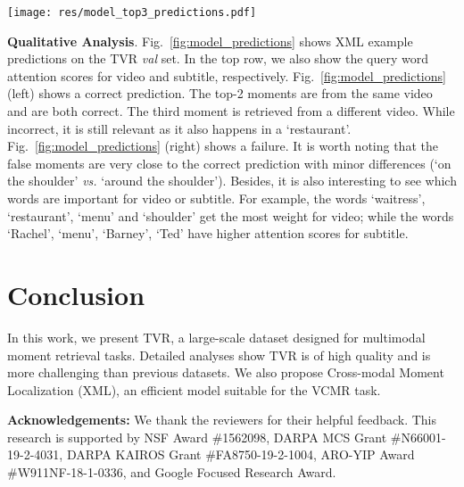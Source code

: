 \documentclass[runningheads]{llncs}
\begin{document}
\begin{figure*}[!t]
  \centering
  \texttt{[image: res/model\_top3\_predictions.pdf]}
  \caption{XML prediction examples for VCMR, on TVR \textit{val} set. We show top-3 retrieved moments for each query. \textit{Top row} shows modular attention scores for query words. \textit{Left column} shows a correct prediction, \textit{right column} shows a failure. Text inside \textit{dashed boxes} is the subtitles associated with the predicted moments. \textit{Orange box} shows the predictions, \textit{green bar} shows the ground truth}
  \label{fig:model_predictions}
\end{figure*}



\kern1mm
\noindent\textbf{Qualitative Analysis}.
Fig.~\ref{fig:model_predictions} shows XML example predictions on the TVR \textit{val} set. 
In the top row, we also show the query word attention scores for video and subtitle, respectively. Fig.~\ref{fig:model_predictions} (left) shows a correct prediction. The top-2 moments are from the same video and are both correct. The third moment is retrieved from a different video. While incorrect, it is still relevant as it also happens in a `restaurant'. Fig.~\ref{fig:model_predictions} (right) shows a failure. It is worth noting that the false moments are very close to the correct prediction with minor differences (`on the shoulder' \textit{vs.} `around the shoulder'). Besides, it is also interesting to see which words are important for video or subtitle. For example, the words `waitress', `restaurant', `menu' and `shoulder' get the most weight for video; while the words `Rachel', `menu', `Barney', `Ted' have higher attention scores for subtitle.


 \section{Conclusion}\label{conclusion}
In this work, we present TVR, a large-scale dataset designed for multimodal moment retrieval tasks. Detailed analyses show TVR is of high quality and is more challenging than previous datasets. We also propose Cross-modal Moment Localization (XML), an efficient model suitable for the VCMR task.

\smallskip
\noindent
{\bf Acknowledgements:} We thank the reviewers for their helpful feedback. This research is supported by NSF Award \#1562098, DARPA MCS Grant \#N66001-19-2-4031, DARPA KAIROS Grant \#FA8750-19-2-1004, ARO-YIP Award \#W911NF-18-1-0336, and Google Focused Research Award.
 
\end{document}
